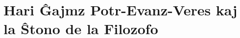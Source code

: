 \part{Hari Ĝajmz Potr-Evanz-Veres kaj la Ŝtono de la Filozofo}
% 
% 
% 
% 
% 
% 
% 
% 
% 
% 
% 
% 
% 
% 
% 
% 
% 
% 
% 
% 
% 
% 
% 
\label{last:chapter}

\appendix
\renewcommand\chaptername{Apendico}

% 
% 
% 
% 




